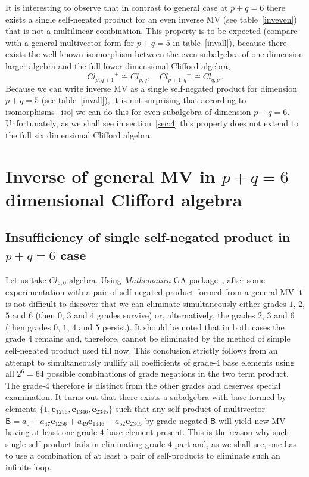 \documentclass{birkjour}
\newcommand{\cl}[2]{\ensuremath{\mathit{Cl}_{#1,#2}}} %
\newcommand{\e}[1]{\mathbf{e}_{#1}} %
\def\m#1{\mathsf{#1}} %
\begin{document}
It is interesting to observe that in contrast to general case at
$p+q=6$ there exists a single self-negated product  for an even
inverse MV (see table~\ref{inveven}) that is not a multilinear
combination. This property is to be expected (compare with  a
general multivector form for $p+q=5$ in table~\ref{invall}),
because there exists the well-known isomorphism between the even
subalgebra of one dimension larger algebra  and the full lower
dimensional Clifford algebra,
\begin{equation}\label{iso}
\cl{p}{q+1}^+\cong\cl{p}{q},\quad\cl{p+1}{q}^+\cong\cl{q}{p}\,.
\end{equation}
Because we can write inverse MV as a single self-negated product
for dimension $p+q=5$ (see table~\ref{invall}), it is not
surprising that according to isomorphisms~\eqref{iso} we can do
this for even subalgebra of dimension $p+q=6$. Unfortunately, as
we shall see in section~\ref{sec:4} this property does not extend
to the full six dimensional Clifford algebra.

\section{Inverse of general MV in $p+q=6$ dimensional Clifford algebra\label{sec:4}}
\subsection{Insufficiency of single self-negated product in $p+q=6$ case\label{sec:4a}}

Let us take $Cl_{6,0}$ algebra. Using \textit{Mathematica} GA
package~\cite{AcusDargys2017}, after some experimentation with a
pair of self-negated product formed from a general MV it is not
difficult to discover that we can eliminate simultaneously either
grades $1$, $2$, $5$ and $6$ (then $0$, $3$ and $4$ grades
survive) or, alternatively,  the grades $2$, $3$ and $6$ (then
grades $0$, $1$, $4$ and $5$ persist). It should be noted that in
both cases the grade $4$ remains and, therefore, cannot be
eliminated by the method of simple self-negated product used till
now. This conclusion strictly follows from an attempt to simultaneously
nullify all coefficients of grade-$4$ base elements using all
$2^6=64$ possible combinations of grade negations in the two term
product. The grade-$4$ therefore is distinct from the other grades and
deserves special examination. It turns out that there exists a
subalgebra with base  formed by elements $\{1, \e{1256},
\e{1346},\e{2345}\}$ such that any self product of multivector
$\m{B}=a_{0}+a_{47} \e{1256}+a_{49} \e{1346}+a_{52} \e{2345}$  by
grade-negated $\m{B}$ will yield new MV having at least one
grade-$4$ base element present. This is the reason why such single
self-product fails in eliminating grade-$4$ part and, as we shall
see, one has to use a combination of at least a pair of
self-products to eliminate such an infinite loop.
\end{document}
